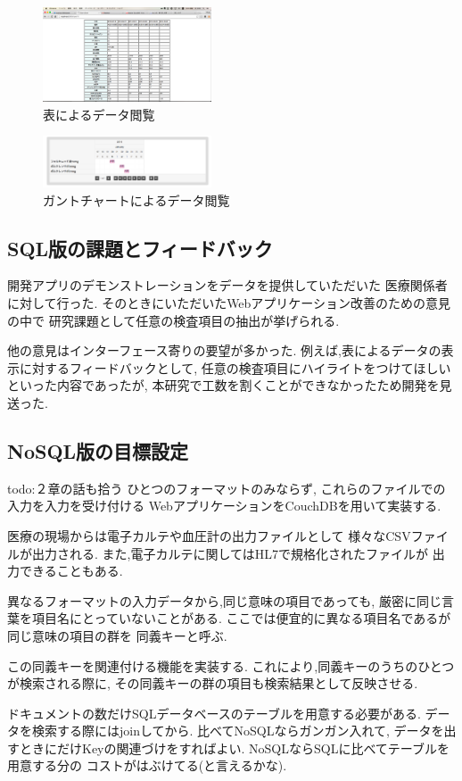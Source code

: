     \begin{figure}[htbp]
        \includegraphics[width=5cm, bb=0 0 437 688]{./gazou/DjangoTable.png}
      \caption{表によるデータ閲覧}
      \label{DjangoTable}
    \end{figure}

    \begin{figure}[htbp]
        \includegraphics[width=5cm, bb=0 0 437 688]{./gazou/DjangoGantt2.png}
      \caption{ガントチャートによるデータ閲覧}
      \label{DjangoGantt}
    \end{figure}



\subsection{SQL版の課題とフィードバック}

  開発アプリのデモンストレーションをデータを提供していただいた
  医療関係者に対して行った.
  そのときにいただいたWebアプリケーション改善のための意見の中で
  研究課題として任意の検査項目の抽出が挙げられる.

  他の意見はインターフェース寄りの要望が多かった.
  例えば,表によるデータの表示に対するフィードバックとして,
  任意の検査項目にハイライトをつけてほしいといった内容であったが,
  本研究で工数を割くことができなかったため開発を見送った.


\subsection{NoSQL版の目標設定}
  todo:２章の話も拾う
  ひとつのフォーマットのみならず,
  これらのファイルでの入力を入力を受け付ける
  WebアプリケーションをCouchDBを用いて実装する.

  医療の現場からは電子カルテや血圧計の出力ファイルとして
  様々なCSVファイルが出力される.
  また,電子カルテに関してはHL7で規格化されたファイルが
  出力できることもある.

  異なるフォーマットの入力データから,同じ意味の項目であっても,
  厳密に同じ言葉を項目名にとっていないことがある.
  ここでは便宜的に異なる項目名であるが同じ意味の項目の群を
  同義キーと呼ぶ.

  この同義キーを関連付ける機能を実装する.
  これにより,同義キーのうちのひとつが検索される際に,
  その同義キーの群の項目も検索結果として反映させる.

  ドキュメントの数だけSQLデータベースのテーブルを用意する必要がある.
  データを検索する際にはjoinしてから.
  比べてNoSQLならガンガン入れて,
  データを出すときにだけKeyの関連づけをすればよい.
  NoSQLならSQLに比べてテーブルを用意する分の
  コストがはぶけてる(と言えるかな).
  \fi
